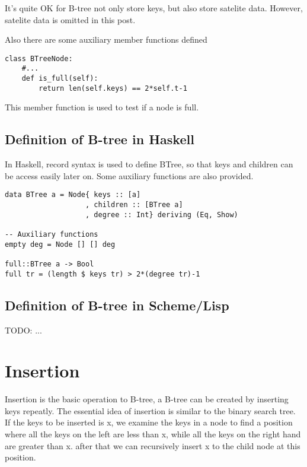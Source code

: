 \documentclass{article}
\begin{document}
It's quite OK for B-tree not only store keys, but also store satelite data.
However, satelite data is omitted in this post.

Also there are some auxiliary member functions defined

\begin{lstlisting}
class BTreeNode:
    #...
    def is_full(self):
        return len(self.keys) == 2*self.t-1
\end{lstlisting}

This member function is used to test if a node is full.

\subsection*{Definition of B-tree in Haskell}
In Haskell, record syntax is used to define BTree, so that keys and children 
can be access easily later on. Some auxiliary functions are also provided.

\lstset{language=Haskell}
\begin{lstlisting}
data BTree a = Node{ keys :: [a]
                   , children :: [BTree a]
                   , degree :: Int} deriving (Eq, Show)

-- Auxiliary functions
empty deg = Node [] [] deg

full::BTree a -> Bool
full tr = (length $ keys tr) > 2*(degree tr)-1
\end{lstlisting} %

\subsection*{Definition of B-tree in Scheme/Lisp}
TODO: ...

\section{Insertion}
\label{btree-insertion}
Insertion is the basic operation to B-tree, a B-tree can be created by inserting
keys repeatly. The essential idea of insertion is similar to the binary
search tree. If the keys to be inserted is x, we examine the keys in a 
node to find a position where all the keys on the left are less than x,
while all the keys on the right hand are greater than x. after that
we can recursively insert x to the child node at this position.
\end{document}
